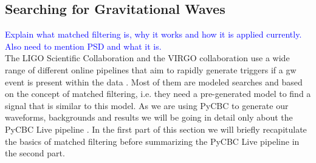 \subsection{Searching for Gravitational Waves}\label{sec:matched_filtering}
\textcolor{blue}{Explain what matched filtering is, why it works and how it is applied currently. Also need to mention PSD and what it is.}\\
The LIGO Scientific Collaboration and the VIRGO collaboration use a wide range of different online pipelines that aim to rapidly generate triggers if a \gls{gw} event is present within the data \cite{ligo_pipelines}. Most of them are modeled searches and based on the concept of matched filtering, i.e. they need a pre-generated model to find a signal that is similar to this model. As we are using PyCBC to generate our waveforms, backgrounds and results we will be going in detail only about the PyCBC Live pipeline \cite{pycbc_live}. In the first part of this section we will briefly recapitulate the basics of matched filtering before summarizing the PyCBC Live pipeline in the second part.
